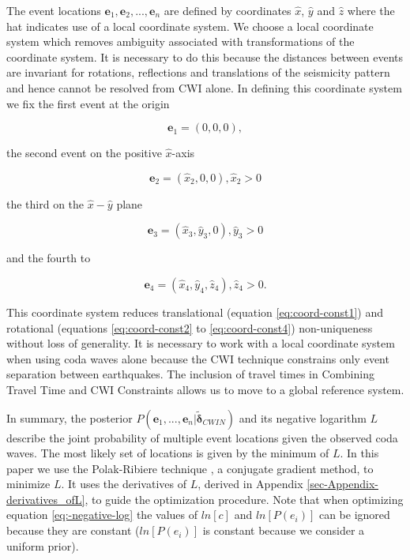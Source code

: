 \documentclass[12pt,double]{article}
\begin{document}
The event locations $\mathbf{e}_1, \mathbf{e}_2, ..., \mathbf{e}_n$
are defined by coordinates $\hat{x}$, $\hat{y}$ and $\hat{z}$ where
the hat indicates use of a local coordinate system. We choose a
local coordinate system which removes ambiguity associated with
transformations of the coordinate system. It is necessary to do this
because the distances between events are invariant for rotations,
reflections and translations of the seismicity pattern and hence
cannot be resolved from CWI alone. In defining this coordinate
system we fix the first event at the origin
\begin{linenomath*} \begin{equation} 
\label{eq:coord-const1}
\mathbf{e}_1 = (0,0,0),
\end{equation} \end{linenomath*}
the second event on the positive $\hat{x}$-axis
\begin{linenomath*} \begin{equation} 
\label{eq:coord-const2}
\mathbf{e}_2 = (\hat{x}_2, 0, 0), \hat{x}_2>0
\end{equation} \end{linenomath*}
the third on the $\hat{x}-\hat{y}$ plane
\begin{linenomath*} \begin{equation}
\label{eq:coord-const3}
\mathbf{e}_3 = (\hat{x}_3,\hat{y}_3,0), \hat{y}_3>0
\end{equation} \end{linenomath*}
and the fourth to
\begin{linenomath*} \begin{equation} 
\label{eq:coord-const4}
\mathbf{e}_4 = (\hat{x}_4,\hat{y}_4,\hat{z}_4), \hat{z}_4>0.
\end{equation} \end{linenomath*}
This coordinate system reduces translational (equation \ref{eq:coord-const1})
and rotational (equations \ref{eq:coord-const2} to \ref{eq:coord-const4}) non-uniqueness
without loss of generality. It is necessary to work with a local coordinate
system when using coda waves alone because the CWI technique constrains only event separation
between earthquakes. The inclusion of travel times in Combining Travel Time and CWI Constraints
allows us to move to a global reference system.

In summary, the posterior $P(\mathbf{e}_1,...,\mathbf{e}_n |
\widetilde{\mathbf{\delta}}_{CWIN})$ and its negative logarithm $L$
describe the joint probability of multiple event locations given the
observed coda waves. The most likely set of locations is given by
the minimum of $L$.   In this paper we use the Polak-Ribiere
technique \citep{dr_Press87a}, a conjugate gradient method, to
minimize $L$. It uses the derivatives of $L$, derived in Appendix
\ref{sec-Appendix-derivatives_ofL}, to guide the
optimization procedure. Note that when optimizing
equation \ref{eq:-negative-log} the values of $ln \left[ c \right]$
and $ln \left[ P(e_i) \right]$ can be ignored because they are
constant ($ln \left[ P(e_i) \right]$ is constant because we
consider a uniform prior).
\end{document}
